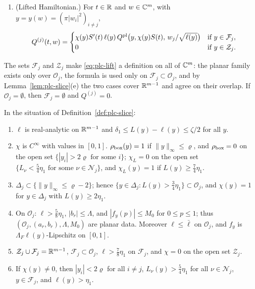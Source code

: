 \begin{definition}
\begin{enumerate}[label=(\arabic*)]
\begin{align*}
 \end{align*}
\item (Lifted Hamiltonian.) For $t\in\mathbb{R}$ and $w\in\mathbb{C}^m$, with $y=y(w)=(\pi|w_i|^2)_{i\ne j}$,
 \begin{equation}\label{eq:plc-lift}
  Q^{(j)}(t,w)=\begin{cases}\chi(y)S'(t)\,\ell(y)\,Q^{\rm pl}\bigl(y,\chi(y)S(t),\,w_j/\sqrt{\ell(y)}\bigr)&\text{if }y\in\mathcal F_j,\\
  0&\text{if }y\in\mathcal Z_j.\end{cases}
 \end{equation}
\end{enumerate}
\end{definition}

The sets $\mathcal F_j$ and $\mathcal Z_j$ make \eqref{eq:plc-lift} a definition on all of $\mathbb{C}^m$: the planar family exists only over $\mathcal O_j$,
the formula is used only on $\mathcal F_j\subset\mathcal O_j$, and by Lemma~\ref{lem:plc-slice}(e) the two cases cover
$\mathbb{R}^{m-1}$ and agree on their overlap. If $\mathcal O_j=\emptyset$, then $\mathcal F_j=\emptyset$ and $Q^{(j)}=0$.

\begin{lemma}\label{lem:plc-slice}
In the situation of Definition~\ref{def:plc-slice}:
\begin{enumerate}[label=(\alph*)]
\item $\ell$ is real-analytic on $\mathbb{R}^{m-1}$ and $\delta_1\le L(y)-\ell(y)\le\zeta/2$ for all $y$.
\item $\chi$ is $C^\infty$ with values in $[0,1]$. $\rho_{\rm box}(y)=1$ if $\|y\|_\infty\le\varrho$, and $\rho_{\rm box}=0$ on the open set
 $\{|y_i|>2\varrho\text{ for some }i\}$; $\chi_L=0$ on the open set $\{L_\nu<\frac54\eta_1\text{ for some }\nu\in\mathcal N_j\}$, and
 $\chi_L(y)=1$ if $L(y)\ge\frac74\eta_1$.
\item $\Delta_j\subset\{\|y\|_\infty\le\varrho-2\}$; hence $\{y\in\Delta_j:L(y)>\frac34\eta_1\}\subset\mathcal O_j$, and $\chi(y)=1$ for
 $y\in\Delta_j$ with $L(y)\ge2\eta_1$.
\item On $\mathcal O_j$: $\ell>\frac58\eta_1$, $|b_r|\le\Lambda$, and $|f_y(p)|\le M_0$ for $0\le p\le1$; thus
 $(\mathcal O_j,(a_r,b_r),\Lambda,M_0)$ are planar data. Moreover $\ell\le\bar\ell$ on $\mathcal O_j$, and $f_y$ is $\Lambda_F\ell(y)$-Lipschitz on $[0,1]$.
\item $\mathcal Z_j\cup\mathcal F_j=\mathbb{R}^{m-1}$, $\mathcal F_j\subset\mathcal O_j$, $\ell>\frac78\eta_1$ on $\mathcal F_j$, and $\chi=0$ on the open
 set $\mathcal Z_j$.
\item If $\chi(y)\ne0$, then $|y_i|<2\varrho$ for all $i\ne j$, $L_\nu(y)>\frac54\eta_1$ for all $\nu\in\mathcal N_j$, $y\in\mathcal F_j$,
 and $\ell(y)>\eta_1$.
\end{enumerate}
\end{lemma}

